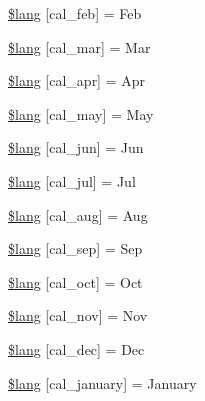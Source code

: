 \begin{DoxyCompactItemize}
\hyperlink{calendar__lang_8php_ac26ad55691325913e5d0f7156c95ff18}{\$lang} \mbox{[}\textquotesingle{}cal\+\_\+feb\textquotesingle{}\mbox{]} = \textquotesingle{}Feb\textquotesingle{}
\item 
\hyperlink{calendar__lang_8php_a22ee24632deb286ad4efb833e2fe7533}{\$lang} \mbox{[}\textquotesingle{}cal\+\_\+mar\textquotesingle{}\mbox{]} = \textquotesingle{}Mar\textquotesingle{}
\item 
\hyperlink{calendar__lang_8php_a61653bb502ac4775a4186ae145e9ff78}{\$lang} \mbox{[}\textquotesingle{}cal\+\_\+apr\textquotesingle{}\mbox{]} = \textquotesingle{}Apr\textquotesingle{}
\item 
\hyperlink{calendar__lang_8php_a7e77a974617dd3fd0ab8d66f59125fdb}{\$lang} \mbox{[}\textquotesingle{}cal\+\_\+may\textquotesingle{}\mbox{]} = \textquotesingle{}May\textquotesingle{}
\item 
\hyperlink{calendar__lang_8php_aabea2be5e0612f96b8d388183c4a3ebb}{\$lang} \mbox{[}\textquotesingle{}cal\+\_\+jun\textquotesingle{}\mbox{]} = \textquotesingle{}Jun\textquotesingle{}
\item 
\hyperlink{calendar__lang_8php_a65585e0f8fda86a900ced005f0bb3c16}{\$lang} \mbox{[}\textquotesingle{}cal\+\_\+jul\textquotesingle{}\mbox{]} = \textquotesingle{}Jul\textquotesingle{}
\item 
\hyperlink{calendar__lang_8php_ab7a387970f84455d8f289020761aeb83}{\$lang} \mbox{[}\textquotesingle{}cal\+\_\+aug\textquotesingle{}\mbox{]} = \textquotesingle{}Aug\textquotesingle{}
\item 
\hyperlink{calendar__lang_8php_a09ed21f8320998bf99f89cc5121a69b2}{\$lang} \mbox{[}\textquotesingle{}cal\+\_\+sep\textquotesingle{}\mbox{]} = \textquotesingle{}Sep\textquotesingle{}
\item 
\hyperlink{calendar__lang_8php_af4d1254dc312bf5e945d47d1011f35f7}{\$lang} \mbox{[}\textquotesingle{}cal\+\_\+oct\textquotesingle{}\mbox{]} = \textquotesingle{}Oct\textquotesingle{}
\item 
\hyperlink{calendar__lang_8php_a6c8f862507c12a677f22d9df6bf92515}{\$lang} \mbox{[}\textquotesingle{}cal\+\_\+nov\textquotesingle{}\mbox{]} = \textquotesingle{}Nov\textquotesingle{}
\item 
\hyperlink{calendar__lang_8php_ab97feaeee2a9c0746ca0a3631c6f70db}{\$lang} \mbox{[}\textquotesingle{}cal\+\_\+dec\textquotesingle{}\mbox{]} = \textquotesingle{}Dec\textquotesingle{}
\item 
\hyperlink{calendar__lang_8php_a8b4025982a3bddb1a5cfd4c37dd5e859}{\$lang} \mbox{[}\textquotesingle{}cal\+\_\+january\textquotesingle{}\mbox{]} = \textquotesingle{}January\textquotesingle{}

\end{DoxyCompactItemize}
